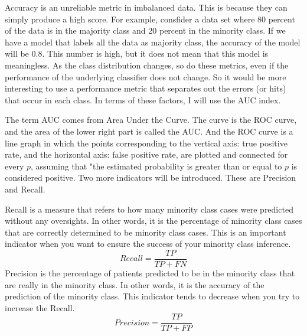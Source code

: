 Accuracy is an unreliable metric in imbalanced data.
This is because they can simply produce a high score.
For example, consfider a data set where 80 percent of the data is in the majority class and 20 percent in the minority class. If we have a model that labels all the data as majority class, the accuracy of the model will be 0.8.
This number is high, but it does not mean that this model is meaningless.
As the class distribution changes, so do these metrics, even if the performance of the underlying classifier does not change.
So it would be more interesting to use a performance metric that separates out the errors (or hits) that occur in each class.
In terms of these factors, I will use the AUC index\cite{ROC}.

The term AUC comes from Area Under the Curve.
The curve is the ROC curve, and the area of the lower right part is called the AUC.
And the ROC curve is a line graph in which the points corresponding to the vertical axis: true positive rate, and the horizontal axis: false positive rate, are plotted and connected for every $p$, assuming that "the estimated probability is greater than or equal to $p$ is considered positive.
Two more indicators will be introduced.
These are Precision and Recall.

Recall is a measure that refers to how many minority class cases were predicted without any oversights.
In other words, it is the percentage of minority class cases that are correctly determined to be minority class cases.
This is an important indicator when you want to ensure the success of your minority class inference.
$$
Recall = \frac{TP}{TP + FN}
$$
Precision is the percentage of patients predicted to be in the minority class that are really in the minority class.
In other words, it is the accuracy of the prediction of the minority class.
This indicator tends to decrease when you try to increase the Recall.
$$
Precision = \frac{TP}{TP + FP}
$$
